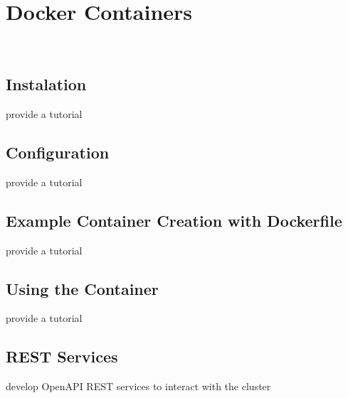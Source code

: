 \chapter{Docker Containers}

\FILENAME\

\section{Instalation}

\begin{exercise}
provide a tutorial 
\end{exercise}

\section{Configuration}

\begin{exercise}
provide a tutorial 
\end{exercise}

\section{Example Container Creation with Dockerfile}

\begin{exercise}
provide a tutorial 
\end{exercise}

\section{Using the Container}

\begin{exercise}
provide a tutorial 
\end{exercise}

\section{REST Services}

\begin{exercise}
develop OpenAPI REST services to interact with the cluster
\end{exercise}

